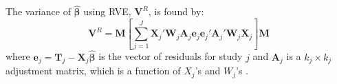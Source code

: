 

The variance of $\bm{\hat{\beta}}$ using RVE, $\mathbf{V}^R$, is found by:
\begin{equation}\label{eq:RVE_VR}
    \mathbf{V}^R = \mathbf{M}\left[ \sum_{j=1}^J \mathbf{X}_j' \mathbf{W}_j\mathbf{A}_j\mathbf{e}_j\mathbf{e}_j'\mathbf{A}_j'\mathbf{W}_j\mathbf{X}_j \right]\mathbf{M}
\end{equation}
where $\mathbf{e}_j = \mathbf{T}_j - \mathbf{X}_j\bm{\hat{\beta}}$ is the vector of residuals for study $j$ and $\mathbf{A}_j$ is a $k_j \times k_j$ adjustment matrix, which is a function of $X_j$'s and $W_j$'s \autocite{tipton2015a,tipton2015b}.  

